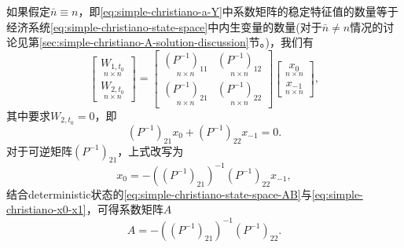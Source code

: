 如果假定$\bar{n} \equiv n$，即\eqref{eq:simple-christiano-a-Y}中系数矩阵的稳定特征值的数量等于经济系统\eqref{eq:simple-christiano-state-space}中内生变量的数量(对于$\bar{n} \neq n$情况的讨论见第\ref{sec:simple-christiano-A-solution-discussion}节。)，我们有
\begin{equation*}
  \begin{bmatrix}
    \underset{n \times n}{W_{1,t_0}} \\
    \underset{n \times n}{W_{2,t_0}}
  \end{bmatrix} = \begin{bmatrix}
  \underset{n \times n}{\left(P^{-1}\right)_{11}} &
  \underset{n \times n}{\left(P^{-1}\right)_{12}} \\
  \underset{n \times n}{\left(P^{-1}\right)_{21}} &
  \underset{n \times n}{\left(P^{-1}\right)_{22}}
  \end{bmatrix} \begin{bmatrix}
    \underset{n \times n}{x_0} \\
    \underset{n \times n}{x_{-1}}
  \end{bmatrix},
\end{equation*}
其中要求$W_{2,t_0} = 0$，即
\begin{equation*}
  \left(P^{-1}\right)_{21} x_0 + \left(P^{-1}\right)_{22} x_{-1} = 0.
\end{equation*}
对于可逆矩阵$\left(P^{-1}\right)_{21}$，上式改写为
\begin{equation}
  \label{eq:simple-christiano-x0-x1}
x_0 = - \left( \left(P^{-1}\right)_{21} \right)^{-1} \left(P^{-1}\right)_{22} x_{-1},
\end{equation}
结合deterministic状态的\eqref{eq:simple-christiano-state-space-AB}与\eqref{eq:simple-christiano-x0-x1}，可得系数矩阵$A$
\begin{equation}
  \label{eq:simple-christiano-A-solution}
  A=- \left( \left(P^{-1}\right)_{21} \right)^{-1} \left(P^{-1}\right)_{22}.
\end{equation}

